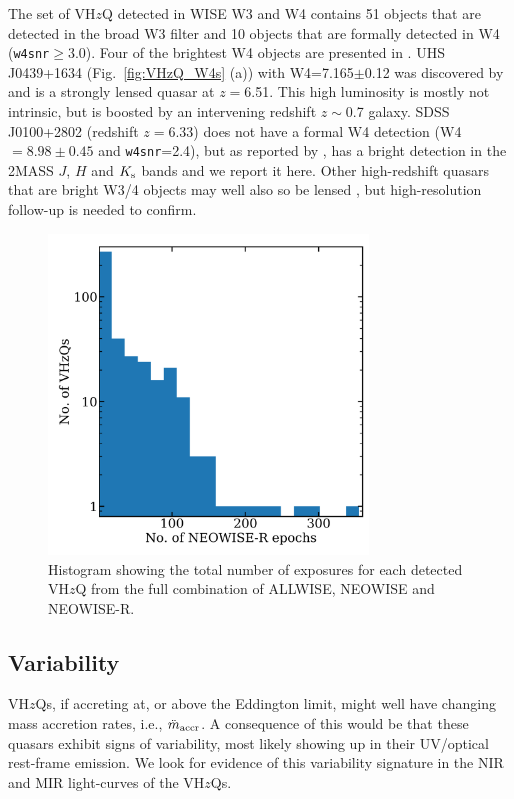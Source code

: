 \documentclass[usenatbib]{mnras}
\begin{document}
The set of VH$z$Q detected in WISE W3 and W4 contains 51 objects that are
detected in the broad W3 filter and 10 objects that are formally detected
in W4 ({\tt w4snr}$\geq$3.0). Four of the brightest W4 objects are
presented in \label{fig:VHzQ_W4s}. UHS J0439+1634
(Fig.~\ref{fig:VHzQ_W4s} (a)) with W4=7.165$\pm$0.12 was discovered by
\citet{Fan2019} and is a strongly lensed quasar at $z=$6.51. This high
luminosity is mostly not intrinsic, but is boosted by an intervening
redshift $z\sim$0.7 galaxy. SDSS J0100+2802 (redshift $z=6.33$) does
not have a formal W4 detection (W4 $=8.98\pm0.45$ and {\tt w4snr}=2.4),
but as reported by \citet{Wu2015}, has a bright detection in the
2MASS $J$, $H$ and $K_{\rm s}$ bands and we report it here.
Other high-redshift quasars that are bright W3/4 objects may well 
also so be lensed \citep[e.g.,][]{Glikman2018lens, Fan2019}, 
but high-resolution follow-up is needed to confirm. 

\begin{figure}
  \centering
  \includegraphics[width=8.5cm]
  {../light_curves/MIR_LCs/NEOWISER_LC_histogramlog_20180827.png}
  \vspace{-16pt}
  \caption[]
  {Histogram showing the total number of exposures for each detected VH$z$Q
    from the full combination of ALLWISE, NEOWISE and NEOWISE-R.} 
  \label{fig:MIR_LC_epochs}
\end{figure}
\subsection{Variability}
VH$z$Qs, if accreting at, or above the Eddington limit, might well
have changing mass accretion rates, i.e., $\ddot{m}_{\rm accr}$. A
consequence of this would be that these quasars exhibit signs of
variability, most likely showing up in their UV/optical rest-frame
emission. We look for evidence of this variability signature in the
NIR and MIR light-curves of the VH$z$Qs.
\end{document}
